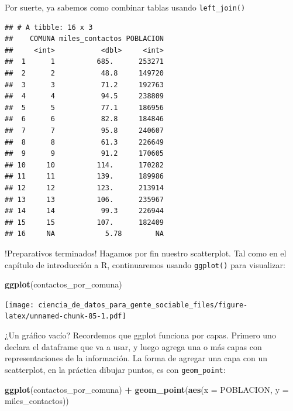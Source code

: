 \documentclass[spanish,]{book}
\newenvironment{Shaded}{\begin{snugshade}}{\end{snugshade}}
\newcommand{\DataTypeTok}[1]{\textcolor[rgb]{0.13,0.29,0.53}{#1}}
\newcommand{\KeywordTok}[1]{\textcolor[rgb]{0.13,0.29,0.53}{\textbf{#1}}}
\newcommand{\NormalTok}[1]{#1}
\newcommand{\OperatorTok}[1]{\textcolor[rgb]{0.81,0.36,0.00}{\textbf{#1}}}
\newcommand{\StringTok}[1]{\textcolor[rgb]{0.31,0.60,0.02}{#1}}
\begin{document}
Por suerte, ya sabemos como combinar tablas usando \texttt{left\_join()}

\begin{Shaded}
\end{Shaded}

\begin{verbatim}
## # A tibble: 16 x 3
##    COMUNA miles_contactos POBLACION
##     <int>           <dbl>     <int>
##  1      1          685.      253271
##  2      2           48.8     149720
##  3      3           71.2     192763
##  4      4           94.5     238809
##  5      5           77.1     186956
##  6      6           82.8     184846
##  7      7           95.8     240607
##  8      8           61.3     226649
##  9      9           91.2     170605
## 10     10          114.      170282
## 11     11          139.      189986
## 12     12          123.      213914
## 13     13          106.      235967
## 14     14           99.3     226944
## 15     15          107.      182409
## 16     NA            5.78        NA
\end{verbatim}

!Preparativos terminados! Hagamos por fin nuestro scatterplot. Tal como en el capítulo de introducción a R, continuaremos usando \texttt{ggplot()} para visualizar:

\begin{Shaded}
\begin{Highlighting}[]
\KeywordTok{ggplot}\NormalTok{(contactos_por_comuna)}
\end{Highlighting}
\end{Shaded}

\texttt{[image: ciencia\_de\_datos\_para\_gente\_sociable\_files/figure-latex/unnamed-chunk-85-1.pdf]}

¿Un gráfico vacío? Recordemos que ggplot funciona por capas. Primero uno declara el dataframe que va a usar, y luego agrega una o más capas con representaciones de la información. La forma de agregar una capa con un scatterplot, en la práctica dibujar puntos, es con \texttt{geom\_point}:

\begin{Shaded}
\begin{Highlighting}[]
\KeywordTok{ggplot}\NormalTok{(contactos_por_comuna) }\OperatorTok{+}\StringTok{ }\KeywordTok{geom_point}\NormalTok{(}\KeywordTok{aes}\NormalTok{(}\DataTypeTok{x =}\NormalTok{ POBLACION, }\DataTypeTok{y =}\NormalTok{ miles_contactos))}
\end{Highlighting}
\end{Shaded}
\end{document}
